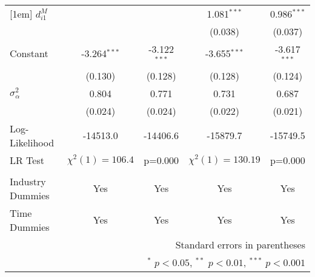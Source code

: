 \begin{center}
\begin{tabular}{l*{4}{c}}
[1em]
$d_{i1}^{M}$    &                     &                     &       1.081$^{***}$&       0.986$^{***}$\\
            &                     &                     &    (0.038)         &    (0.037)         \\
[1em]
Constant      &      -3.264$^{***}$&      -3.122$^{***}$&      -3.655$^{***}$&      -3.617$^{***}$\\
            &     (0.130)         &     (0.128)         &     (0.128)         &     (0.124)         \\
\hline
$\sigma^{2}_{\alpha}$     &       0.804         &       0.771         &       0.731 &       0.687         \\
                & (0.024) & (0.024)&(0.022) & (0.021)\\
Log-Likelihood          &    -14513.0         &    -14406.6         &
                                                                      -15879.7
                                    &    -15749.5         \\
LR Test & $\chi^{2}(1)= 106.4 $ &p=0.000& $\chi^{2}(1)=130.19$
                                           & p=0.000 \\
& & &&\\

\hline
\hline
Industry Dummies & Yes& Yes& Yes& Yes\\
Time Dummies& Yes& Yes& Yes& Yes\\
\hline\hline
\multicolumn{5}{r}{\footnotesize Standard errors  in parentheses}\\
\multicolumn{5}{r}{\footnotesize $^{*}$ \(p<0.05\), $^{**}$ \(p<0.01\), $^{***}$ \(p<0.001\)}\\
\end{tabular}
\end{center}

